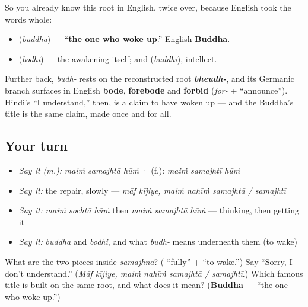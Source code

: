 So you already know this root in English, twice over, because English took the words whole:

\begin{itemize}
\raggedright
  \item \textbf{} (\emph{buddha}) — \textquotedblleft{}\textbf{the one who woke up}.\textquotedblright{} English \textbf{Buddha}.
  \item \textbf{} (\emph{bodhi}) — the awakening itself; and \textbf{} (\emph{buddhi}), intellect.
\end{itemize}

Further back, \emph{budh-} rests on the reconstructed root \emph{\textbf{bheudh-}}, and its Germanic branch surfaces in English \textbf{bode}, \textbf{forebode} and \textbf{forbid} (\emph{for-} + \textquotedblleft{}announce\textquotedblright{}). Hindi's \textquotedblleft{}I understand,\textquotedblright{} then, is a claim to have woken up — and the Buddha's title is the same claim, made once and for all.

\subsection*{Your turn}
\begin{itemize}
\raggedright
  \item \emph{Say it (m.):} \emph{maiṁ samajhtā hūṁ}  ·  (f.): \emph{maiṁ samajhtī hūṁ}
  \item \emph{Say it:} the repair, slowly — \emph{māf kījiye, maiṁ nahīṁ samajhtā / samajhtī}
  \item \emph{Say it:} \emph{maiṁ sochtā hūṁ} then \emph{maiṁ samajhtā hūṁ} — thinking, then getting it
  \item \emph{Say it:} \emph{buddha} and \emph{bodhi}, and what \emph{budh-} means underneath them (to wake)
\end{itemize}

\begin{tcolorbox}[breakable,colback=teal!4,colframe=teal!35!black,title={Before you move on}]
What are the two pieces inside \emph{samajhnā}? (\textbf{} \textquotedblleft{}fully\textquotedblright{} + \textbf{} \textquotedblleft{}to wake.\textquotedblright{}) Say \textquotedblleft{}Sorry, I don't understand.\textquotedblright{} (\emph{Māf kījiye, maiṁ nahīṁ samajhtā / samajhtī}.) Which famous title is built on the same root, and what does it mean? (\textbf{Buddha} — \textquotedblleft{}the one who woke up.\textquotedblright{})
\end{tcolorbox}

